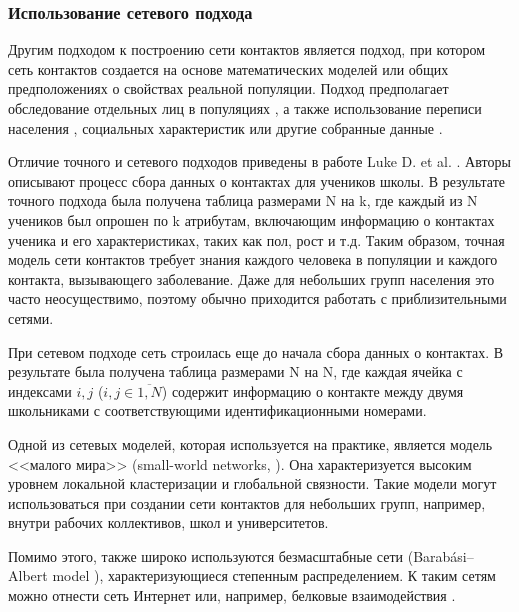 \documentclass[14pt,a4paper]{article}
\begin{document}
\subsubsection{Использование сетевого подхода}

Другим подходом к построению сети контактов является подход, при котором сеть контактов создается на основе математических моделей или общих предположениях о свойствах реальной популяции. Подход предполагает обследование отдельных лиц в популяциях \cite{Eubank}, а также
использование переписи населения \cite{Meyers}, социальных характеристик \cite{Meyers} или другие собранные данные \cite{Meyers_2003}.

Отличие точного и сетевого подходов приведены в работе Luke D. et al. \cite{Luke}. Авторы описывают процесс сбора данных о контактах для учеников школы. В результате точного подхода была получена таблица размерами N на k, где каждый из N учеников был опрошен по k атрибутам, включающим информацию о контактах ученика и его характеристиках, таких как пол, рост и т.д. Таким образом, точная модель сети контактов требует знания каждого человека в популяции и каждого контакта, вызывающего
заболевание. Даже для небольших групп населения это часто неосуществимо, поэтому обычно приходится работать с приблизительными сетями. 

При сетевом подходе сеть строилась еще до начала сбора данных о контактах. В результате была получена таблица размерами N на N, где каждая ячейка с индексами $i, j$ ($i, j \in \overline{1, N}$) содержит информацию о контакте между двумя школьниками с соответствующими идентификационными номерами. 

Одной из сетевых моделей, которая используется на практике, является модель <<малого мира>> (small-world networks, \cite{Watts}). Она характеризуется высоким уровнем локальной кластеризации и глобальной связности. Такие модели могут использоваться при создании сети контактов для небольших групп, например, внутри рабочих коллективов, школ и университетов.

Помимо этого, также широко используются безмасштабные сети (Barabási–Albert model \cite{BA}), характеризующиеся степенным распределением.
К таким сетям можно отнести сеть Интернет \cite{www} или, например, белковые взаимодействия \cite{Wuchty}.
\end{document}
